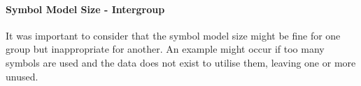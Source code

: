 \paragraph{Symbol Model Size - Intergroup}
It was important to consider that the symbol model size might be fine for one group but inappropriate for another. An example might occur if too many symbols are used and the data does not exist to utilise them, leaving one or more unused. 



%




